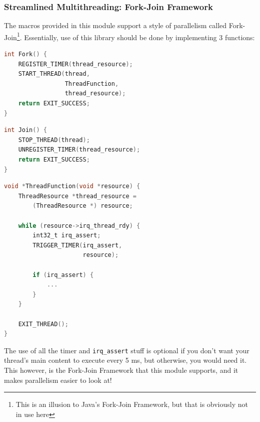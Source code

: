 \documentclass[letterpaper]{article}
\begin{document}
\newpage

\subsubsection{Streamlined Multithreading: Fork-Join Framework}
The macros provided in this module support a style of parallelism called Fork-Join\footnote{This is an illusion to Java's Fork-Join Framework, but that is obviously not in use here}. Essentially, use of this library should be done by implementing 3 functions:

\begin{multicols}{2}
    \begin{lstlisting}[language=C]
int Fork() {
    REGISTER_TIMER(thread_resource);
    START_THREAD(thread,
                 ThreadFunction,
                 thread_resource);
    return EXIT_SUCCESS;
}
    \end{lstlisting}
    \columnbreak
    \begin{lstlisting}[language=C]
int Join() {
    STOP_THREAD(thread);
    UNREGISTER_TIMER(thread_resource);
    return EXIT_SUCCESS;
}
    \end{lstlisting}
    
\end{multicols}


\begin{center}
    \begin{lstlisting}[language=C]
void *ThreadFunction(void *resource) {
    ThreadResource *thread_resource =
        (ThreadResource *) resource;

    while (resource->irq_thread_rdy) {
        int32_t irq_assert;
        TRIGGER_TIMER(irq_assert,
                      resource);

        if (irq_assert) {
            ...
        }
    }

    EXIT_THREAD();
}
    \end{lstlisting}
\end{center}

The use of all the timer and \texttt{irq\_assert} stuff is optional if you don't want your thread's main content to execute every 5 ms, but otherwise, you would need it. This however, is the Fork-Join Framework that this module supports, and it makes parallelism easier to look at!

\newpage
\end{document}
